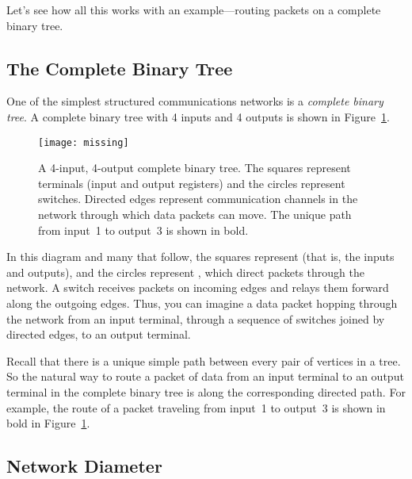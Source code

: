 Let's see how all this works with an example---routing packets on a
complete binary tree.

\subsection{The Complete Binary Tree}

One of the simplest structured communications networks is a
\emph{complete binary tree}.  A complete binary tree with 4 inputs and
4 outputs is shown in Figure~\ref{fig:6EH}.

\begin{figure}


\texttt{[image: missing]}

\caption{A 4-input, 4-output complete binary tree.  The squares
  represent terminals (input and output registers) and the circles
  represent switches.  Directed edges represent communication channels
  in the network through which data packets can move.  The unique path
  from input~1 to output~3 is shown in bold.}

\label{fig:6EH}

\end{figure}

In this diagram and many that follow, the squares represent
 (that is, the inputs and outputs), and the circles
represent , which direct packets through the network.
A switch receives packets on incoming edges and relays them forward
along the outgoing edges.  Thus, you can imagine a data packet hopping
through the network from an input terminal, through a sequence of
switches joined by directed edges, to an output terminal.

Recall that there is a unique simple path between every pair of
vertices in a tree.  So the natural way to route a packet of data from
an input terminal to an output terminal in the complete binary tree is
along the corresponding directed path.  For example, the route of a
packet traveling from input~1 to output~3 is shown in bold in
Figure~\ref{fig:6EH}.

\subsection{Network Diameter}

